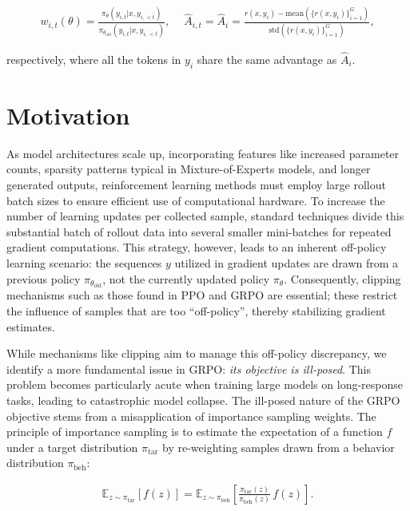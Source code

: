 \begin{align}
    w_{i,t}(\theta)=\frac{ \pi_{\theta} (y_{i,t} | x, y_{i,<t}) }{ \pi_{\theta_\text{old}} (y_{i,t} | x,y_{i,<t})},\quad\ 
    \widehat{A}_{i,t} = \widehat{A}_{i} = \frac{r(x, y_i) - \mathrm{mean} \left( \{ r(x, y_i) \}_{i=1}^G \right) }{ \mathrm{std} \left( \{ r(x, y_i) \}_{i=1}^G \right) },
\end{align}

respectively, where all the tokens in $y_i$ share the same advantage as $\widehat{A}_{i}$.

\section{Motivation}
\label{sec:motivation}

As model architectures scale up, incorporating features like increased parameter counts, sparsity patterns typical in Mixture-of-Experts models, and longer generated outputs, reinforcement learning methods must employ large rollout batch sizes to ensure efficient use of computational hardware. To increase the number of learning updates per collected sample, standard techniques divide this substantial batch of rollout data into several smaller mini-batches for repeated gradient computations. This strategy, however, leads to an inherent off-policy learning scenario: the sequences $y$ utilized in gradient updates are drawn from a previous policy $\pi_{\theta_\text{old}}$, not the currently updated policy $\pi_\theta$. Consequently, clipping mechanisms such as those found in PPO and GRPO are essential; these restrict the influence of samples that are too ``off-policy'', thereby stabilizing gradient estimates.

While mechanisms like clipping aim to manage this off-policy discrepancy, we identify a more fundamental issue in GRPO: \textit{its objective is ill-posed}. This problem becomes particularly acute when training large models on long-response tasks, leading to catastrophic model collapse. The ill-posed nature of the GRPO objective stems from a misapplication of importance sampling weights. The principle of importance sampling is to estimate the expectation of a function $f$ under a target distribution $\pi_\text{tar}$ by re-weighting samples drawn from a behavior distribution $\pi_\text{beh}$:

\begin{align}
\mathbb{E}_{z \sim \pi_\text{tar}} \left[ f(z) \right] = \mathbb{E}_{z \sim \pi_\text{beh}} \left[ \frac{ \pi_\text{tar} (z) }{ \pi_\text{beh} (z)} \, f(z) \right].
\end{align}

